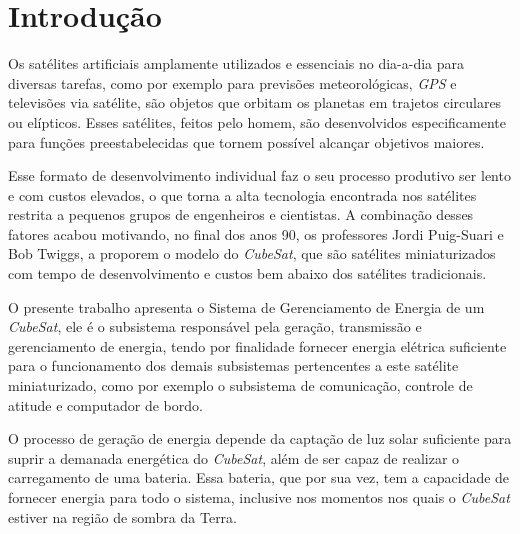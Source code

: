 \documentclass[
	12pt,				%
	openright,			%
	oneside,			%
	a4paper,			%
	english,			%
	french,				%
	spanish,			%
	brazil,				%
	oldfontcommands
	]{abntex2}
\begin{document}
\tableofcontents*
\cleardoublepage



\textual

\chapter[Introdução]{Introdução}

	Os satélites artificiais amplamente utilizados e essenciais no dia-a-dia para diversas tarefas, como por exemplo para previsões meteorológicas, \textit{GPS} e televisões via satélite, são objetos que orbitam os planetas em trajetos circulares ou elípticos. Esses satélites, feitos pelo homem, são desenvolvidos especificamente para funções preestabelecidas que tornem possível alcançar objetivos maiores. 
	
	Esse formato de desenvolvimento individual faz o seu processo produtivo ser lento e com custos elevados, o que torna a alta tecnologia encontrada nos satélites restrita a pequenos grupos de engenheiros e cientistas. A combinação desses fatores acabou motivando, no final dos anos 90, os professores Jordi Puig-Suari e Bob Twiggs, a proporem o modelo do \textit{CubeSat}, que são satélites miniaturizados com tempo de desenvolvimento e custos bem abaixo dos satélites tradicionais.
	
	O presente trabalho apresenta o Sistema de Gerenciamento de Energia de um \textit{CubeSat}, ele é o subsistema responsável pela geração, transmissão e gerenciamento de energia, tendo por finalidade fornecer energia elétrica suficiente para o funcionamento dos demais subsistemas pertencentes a este satélite miniaturizado, como por exemplo o subsistema de comunicação, controle de atitude e computador de bordo.
	
	O processo de geração de energia depende da captação de luz solar suficiente para suprir a demanada energética do \textit{CubeSat}, além de ser capaz de realizar o carregamento de uma bateria. Essa bateria, que por sua vez, tem a capacidade de fornecer energia para todo o sistema, inclusive nos momentos nos quais o \textit{CubeSat} estiver na região de sombra da Terra.
	
\end{document}

